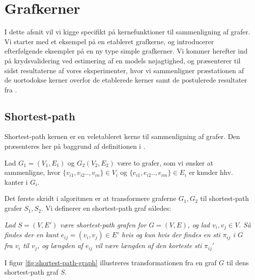 \documentclass{article}
\begin{document}
\section{Grafkerner}
I dette afsnit vil vi kigge specifikt på kernefunktioner til sammenligning af grafer. Vi starter med et eksempel på en etableret grafkerne, og introducerer efterfølgende eksempler på en ny type simple grafkerner. Vi kommer herefter ind på krydsvalidering ved estimering af en models nøjagtighed, og præsenterer til sidst resultaterne af vores eksperimenter, hvor vi sammenligner præstationen af de uortodokse kerner overfor de etablerede kerner samt de postulerede resultater fra \cite{trivial-kernels}.

\subsection{Shortest-path}
Shortest-path kernen er en veletableret kerne til sammenligning af grafer. Den præsenteres her på baggrund af definitionen i \cite{shortest-path}. 

Lad $G_1=(V_1,E_1)$ og $G_2(V_2,E_2)$ være to grafer, som vi ønsker at sammenligne, hvor $\{v_{i1},v_{i2}..,v_{in}\}\in V_i$ og $\{e_{i1},e_{i2}..,e_{im}\}\in E_i$ er knuder hhv. kanter i $G_i$.

Det første skridt i algoritmen er at transformere graferne $G_1,G_2$ til shortest-path grafer $S_1,S_2$. Vi definerer en shortest-path graf således:

\textit{Lad $S=(V,E')$ være shortest-path grafen for $G=(V,E)$, og lad $v_i,v_j\in V$. Så findes der en kant $e_{ij}=(v_i,v_j)\in E'$ hvis og kun hvis der findes en sti $\pi_{ij}$ i $G$ fra $v_i$ til $v_j$, og længden af $e_{ij}$ vil være længden af den korteste sti $\pi_{ij}'$}

I figur \ref{fig:shortest-path-graph} illustreres transformationen fra en graf $G$ til dens shortest-path graf $S$.
\end{document}
